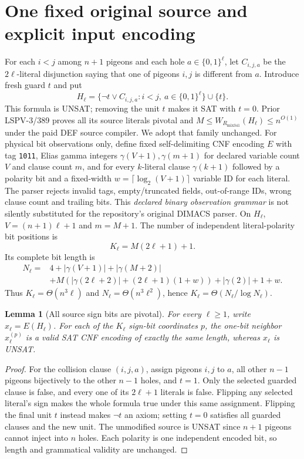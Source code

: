 \documentclass[11pt]{article}
\newtheorem{lemma}[theorem]{Lemma}
\begin{document}
\section*{One fixed original source and explicit input encoding}
For each $i<j$ among $n+1$ pigeons and each hole $a\in\{0,1\}^\ell$, let $C_{i,j,a}$ be the $2\ell$-literal disjunction saying that one of pigeons $i,j$ is different from $a$. Introduce fresh guard $t$ and put
\[
H_\ell=\{\neg t\vee C_{i,j,a}:i<j,\ a\in\{0,1\}^\ell\}\cup\{t\}.
\]
This formula is UNSAT; removing the unit $t$ makes it SAT with $t=0$. Prior LSPV-3/389 proves all its source literals pivotal and $M\le W_{R_{\mathrm{mix341}}}(H_\ell)\le n^{O(1)}$ under the paid DEF source compiler. We adopt that family unchanged.
For physical bit observations only, define fixed self-delimiting CNF encoding $E$ with tag \texttt{1011}, Elias gamma integers $\gamma(V+1),\gamma(m+1)$ for declared variable count $V$ and clause count $m$, and for every $k$-literal clause $\gamma(k+1)$ followed by a polarity bit and a fixed-width $w=\lceil\log_2(V+1)\rceil$ variable ID for each literal. The parser rejects invalid tags, empty/truncated fields, out-of-range IDs, wrong clause count and trailing bits. This \emph{declared binary observation grammar} is not silently substituted for the repository's original DIMACS parser. On $H_\ell$, $V=(n+1)\ell+1$ and $m=M+1$.
The number of independent literal-polarity bit positions is
\[
K_\ell=M(2\ell+1)+1.
\]
Its complete bit length is
\[
\begin{split}
N_\ell={}&4+|\gamma(V+1)|+|\gamma(M+2)|\\
&+M\left(|\gamma(2\ell+2)|+(2\ell+1)(1+w)\right)
+|\gamma(2)|+1+w.
\end{split}
\]
Thus $K_\ell=\Theta(n^3\ell)$ and $N_\ell=\Theta(n^3\ell^2)$, hence $K_\ell=\Theta(N_\ell/\log N_\ell)$.
\begin{lemma}[All source sign bits are pivotal]
For every $\ell\ge1$, write $x_\ell=E(H_\ell)$. For each of the $K_\ell$ sign-bit coordinates $p$, the one-bit neighbor $x_\ell^{(p)}$ is a valid SAT CNF encoding of exactly the same length, whereas $x_\ell$ is UNSAT.
\end{lemma}
\begin{proof}
For the collision clause $(i,j,a)$, assign pigeons $i,j$ to $a$, all other $n-1$ pigeons bijectively to the other $n-1$ holes, and $t=1$. Only the selected guarded clause is false, and every one of its $2\ell+1$ literals is false. Flipping any selected literal's sign makes the whole formula true under this same assignment. Flipping the final unit $t$ instead makes $\neg t$ an axiom; setting $t=0$ satisfies all guarded clauses and the new unit. The unmodified source is UNSAT since $n+1$ pigeons cannot inject into $n$ holes. Each polarity is one independent encoded bit, so length and grammatical validity are unchanged.
\end{proof}
\end{document}
